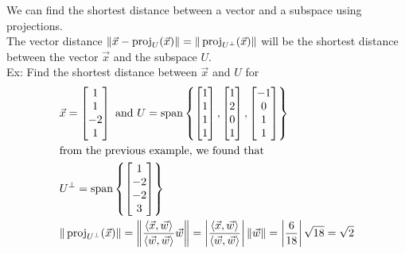 \documentclass[11pt, fleqn]{article}
\begin{document}
We can find the shortest distance between a vector and a subspace using projections.\\
The vector distance $\|\vec{x}-\operatorname{proj}_U(\vec{x})\|=\|\operatorname{proj}_{U^\perp}(\vec{x})\|$ will be the shortest distance between the vector $\vec{x}$ and the subspace $U$.\\
Ex: Find the shortest distance between $\vec{x}$ and $U$ for
\begin{align*}
    &\vec{x}=\matrixx{1\\1\\-2\\1}\text{ and }U=\spann\brcurly{\matrixx{1\\1\\1\\1},\matrixx{1\\2\\0\\1},\matrixx{-1\\0\\1\\1}}\\
    &\text{from the previous example, we found that}\\
    &U^\perp=\spann\brcurly{\matrixx{1\\-2\\-2\\3}}\\
    &\|\proj_{U^\perp}(\vec{x})\|=\left\|\frac{\brangle{\vec{x},\vec{w}}}{\brangle{\vec{w},\vec{w}}}\vec{w}\right\|=\brvertical{\frac{\brangle{\vec{x},\vec{w}}}{\brangle{\vec{w},\vec{w}}}}\|\vec{w}\|=\brvertical{\frac{6}{18}}\sqrt{18}=\sqrt{2}
\end{align*}
\end{document}

